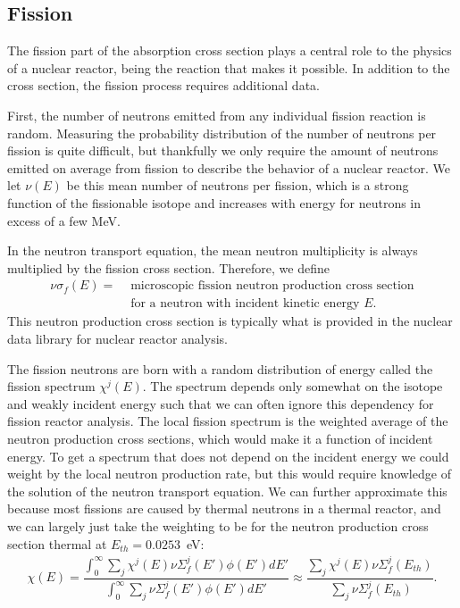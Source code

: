 \subsection{Fission}

The fission part of the absorption cross section plays a central role to the physics of a nuclear reactor, being the reaction that makes it possible. In addition to the cross section, the fission process requires additional data. 

First, the number of neutrons emitted from any individual fission reaction is random. Measuring the probability distribution of the number of neutrons per fission is quite difficult, but thankfully we only require the amount of neutrons emitted on average from fission to describe the behavior of a nuclear reactor. We let $\nu(E)$ be this mean number of neutrons per fission, which is a strong function of the fissionable isotope and increases with energy for neutrons in excess of a few MeV.

In the neutron transport equation, the mean neutron multiplicity is always multiplied by the fission cross section. Therefore, we define
\begin{align}
  \nu \sigma_f(E) = 	&\text{ microscopic fission neutron production cross section} \nonumber \\
  						&\text{ for a neutron with incident kinetic energy $E$.} \nonumber 
\end{align}
This neutron production cross section is typically what is provided in the nuclear data library for nuclear reactor analysis.

The fission neutrons are born with a random distribution of energy called the fission spectrum $\chi^j(E)$. The spectrum depends only somewhat on the isotope and weakly incident energy such that we can often ignore this dependency for fission reactor analysis. The local fission spectrum is the weighted average of the neutron production cross sections, which would make it a function of incident energy. To get a spectrum that does not depend on the incident energy we could weight by the local neutron production rate, but this would require knowledge of the solution of the neutron transport equation. We can further approximate this because most fissions are caused by thermal neutrons in a thermal reactor, and we can largely just take the weighting to be for the neutron production cross section thermal at $E_{th} = 0.0253$~eV:
\begin{align}
  \chi(E) = \dfrac{ \displaystyle\int_0^\infty \sum_j \chi^j(E) \nu\Sigma_f^j(E') \phi(E') dE' }{ \displaystyle\int_0^\infty \sum_j \nu\Sigma_f^j(E') \phi(E') dE' } \approx 
  \dfrac{ \displaystyle\sum_j \chi^j(E) \nu\Sigma_f^j(E_{th})}{ \displaystyle\ \sum_j \nu\Sigma_f^j(E_{th})  } .
\end{align}

